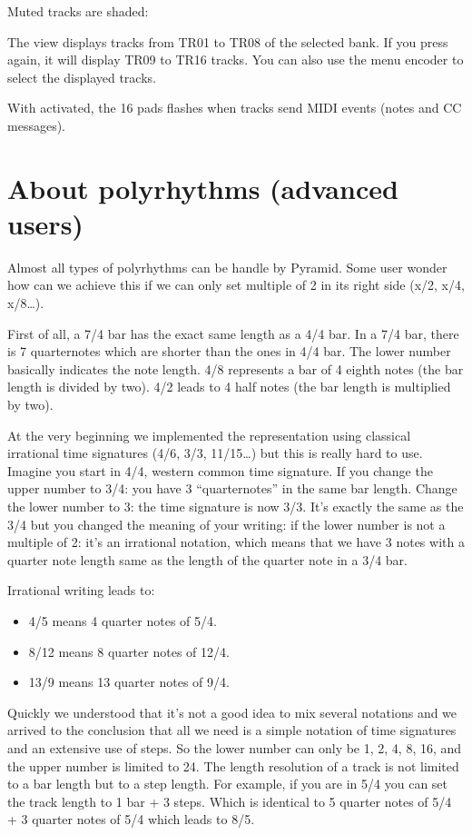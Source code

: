 Muted tracks are shaded:


The  view displays tracks from TR01 to TR08 of the selected bank. If you press  again, it will display TR09 to TR16 tracks. You can also use the menu encoder to select the displayed tracks.

With  activated, the 16 pads flashes when tracks send MIDI events (notes and CC messages).


\section{About polyrhythms (advanced users)}

Almost all types of polyrhythms can be handle by Pyramid. Some user wonder how can we achieve this if we can only set multiple of 2 in its right side (x/2, x/4, x/8\ldots).

First of all, a 7/4 bar has the exact same length as a 4/4 bar. In a 7/4 bar, there is 7 quarternotes which are shorter than the ones in 4/4 bar. The lower number basically indicates the note length. 4/8 represents a bar of 4 eighth notes (the bar length is divided by two). 4/2 leads to 4 half notes (the bar length is multiplied by two).

At the very beginning we implemented the representation using classical irrational time signatures (4/6, 3/3, 11/15\ldots) but this is really hard to use. Imagine you start in 4/4, western common time signature. If you change the upper number to 3/4: you have 3 “quarternotes” in the same bar length. Change the lower number to 3: the time signature is now 3/3. It's exactly the same as the 3/4 but you changed the meaning of your writing: if the lower number is not a multiple of 2: it's an irrational notation, which means that we have 3 notes with a quarter note length same as the length of the quarter note in a 3/4 bar.

Irrational writing leads to:

\begin{itemize}
\item 4/5 means 4 quarter notes of 5/4.
\item 8/12 means 8 quarter notes of 12/4.
\item 13/9 means 13 quarter notes of 9/4.
\end{itemize}

Quickly we understood that it's not a good idea to mix several notations and we arrived to the conclusion that all we need is a simple notation of time signatures and an extensive use of steps. So the lower number can only be 1, 2, 4, 8, 16, and the upper number is limited to 24. The length resolution of a track is not limited to a bar length but to a step length. For example, if you are in 5/4 you can set the track length to 1 bar + 3 steps. Which is identical to 5 quarter notes of 5/4 + 3 quarter notes of 5/4 which leads to 8/5.

